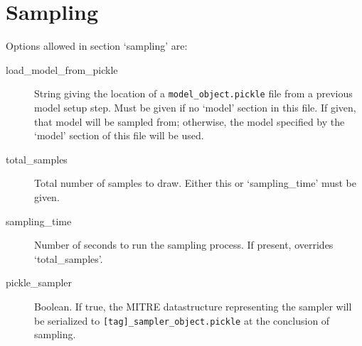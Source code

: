 \documentclass[12pt]{report}
\begin{document}
\section{Sampling}\label{sampling}
Options allowed in section `sampling' are:
\begin{description}
\item[load\_model\_from\_pickle] String giving the location of a
  \texttt{model\_object.pickle} file from a previous model setup
  step. Must be given if no `model' section in this file. If given,
  that model will be sampled from; otherwise, the model specified by
  the `model' section of this file will be used.
\item[total\_samples] Total number of samples to draw. Either this or
  `sampling\_time' must be given.
\item[sampling\_time] Number of seconds to run the sampling process. If present,
  overrides `total\_samples'.
\item[pickle\_sampler] Boolean. If true, the MITRE datastructure
  representing the sampler will be serialized to
  \texttt{[tag]\_sampler\_object.pickle} at the conclusion of
  sampling.
\end{description}
\end{document}
